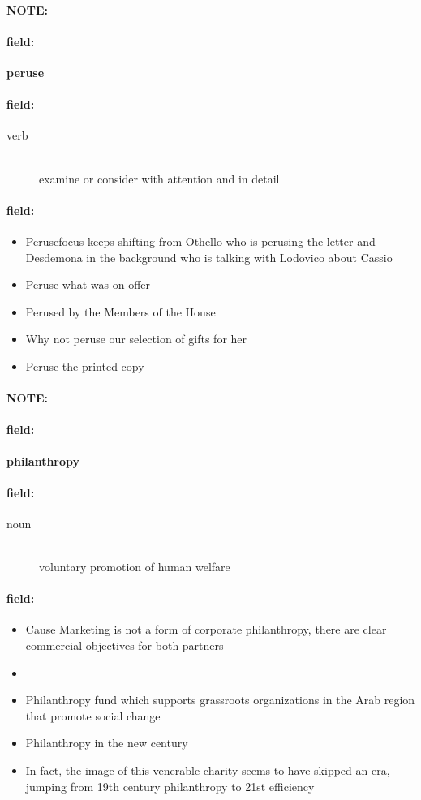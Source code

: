 \documentclass[12pt]{article}
\newenvironment{note}{\paragraph{NOTE:}}{}
\newenvironment{field}{\paragraph{field:}}{}
\begin{document}
\begin{note}
\begin{field}
\textbf{\large peruse}
\end{field}


\begin{field}
\begin{description}
\item[verb] \hfill \\ 
examine or consider with attention and in detail

\end{description}
\end{field}

\begin{field}
\begin{itemize}
\item Perusefocus keeps shifting from Othello who is perusing the letter and Desdemona in the background who is talking with Lodovico about Cassio
\item Peruse what was on offer
\item Perused by the Members of the House
\item Why not peruse our selection of gifts for her
\item Peruse the printed copy
\end{itemize}
\end{field}
\end{note}
\begin{note}
\begin{field}
\textbf{\large philanthropy}
\end{field}


\begin{field}
\begin{description}
\item[noun] \hfill \\ 
voluntary promotion of human welfare

\end{description}
\end{field}

\begin{field}
\begin{itemize}
\item Cause Marketing is not a form of corporate philanthropy, there are clear commercial objectives for both partners
\item 
\item Philanthropy fund which supports grassroots organizations in the Arab region that promote social change
\item Philanthropy in the new century
\item In fact, the image of this venerable charity seems to have skipped an era, jumping from 19th century philanthropy to 21st efficiency
\end{itemize}
\end{field}
\end{note}
\end{document}
